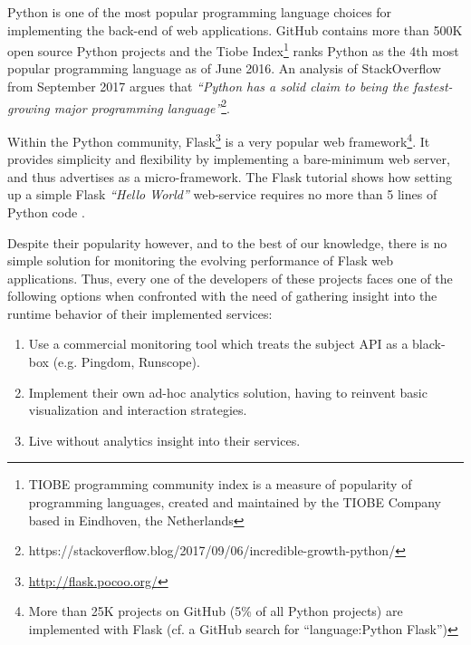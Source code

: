 Python is one of the most popular programming language choices for implementing the back-end of web applications. GitHub contains more than 500K open source Python projects and the Tiobe Index\footnote{TIOBE programming community index is a measure of popularity of programming languages, created and maintained by the TIOBE Company based in Eindhoven, the Netherlands} ranks Python as the 4th most popular programming language as of June 2016. An analysis of  StackOverflow from September 2017 argues that {\em ``Python has a solid claim to being the fastest-growing major programming language''}\footnote{https://stackoverflow.blog/2017/09/06/incredible-growth-python/}.
 
Within the Python community, Flask\footnote{\url{http://flask.pocoo.org/}} is a very popular web framework\footnote{More than 25K projects on GitHub (5\% of all Python projects) are implemented with Flask (cf. a GitHub search for ``language:Python Flask'')}. It provides simplicity and flexibility by implementing a bare-minimum web server, and thus advertises as a micro-framework. The Flask tutorial shows how setting up a simple Flask {\em ``Hello World''} web-service requires no more than 5 lines of Python code \cite{ flask:tutorial}.
 
Despite their popularity however, and to the best of our knowledge, there is no simple solution for monitoring the evolving performance of Flask web applications. Thus, every one of the developers of these projects faces one of the following options when confronted with the need of gathering insight into the runtime behavior of their implemented services: 

  \begin{enumerate}

    \item Use a commercial monitoring tool which treats the subject API as a black-box (e.g. Pingdom, Runscope). 

    \item Implement their own ad-hoc analytics solution, having to reinvent basic visualization and interaction strategies. 

    \item Live without analytics insight into their services.

  \end{enumerate}

